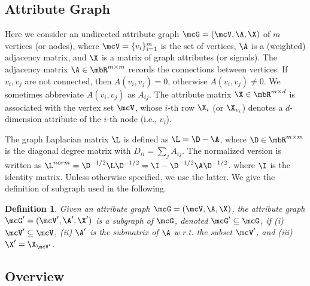\documentclass[letterpaper]{article} \usepackage{aaai19}  \usepackage{times}  \usepackage{helvet}  \usepackage{courier}  \usepackage{url}  \usepackage{graphicx}  \frenchspacing  \setlength{\pdfpagewidth}{8.5in}  \setlength{\pdfpageheight}{11in}
\def\ie{{i.e.}} \def\etal{{et.al}}
\newtheorem{defn}{Definition}
\begin{document}
\subsection{Attribute Graph}

Here we consider an undirected attribute graph $\mcG=(\mcV,\A,\X)$ of $m$ vertices (or nodes), where $\mcV=\{v_i\}_{i=1}^{m}$ is the set of vertices, $\A$ is a (weighted) adjacency matrix, and $\X$ is a matrix of graph attributes (or signals). The adjacency matrix $\A\in\mbR^{m\times m}$ records the connections between vertices. If $v_i, v_j$ are not connected, then $A(v_i,v_j)=0$, otherwise $A(v_i,v_j)\neq 0$. We sometimes abbreviate $A(v_i,v_j)$ as $A_{ij}$. The attribute matrix $\X\in\mbR^{m\times d}$ is associated with the vertex set $\mcV$, whose $i$-th row $\X_{i}$ (or $\X_{v_i}$) denotes a $d$-dimension attribute of the $i$-th node (\ie, $v_i$).

The graph Laplacian matrix $\L$ is defined as $\L = \D-\A$, where $\D\in\mbR^{m\times m}$ is the diagonal degree matrix with $D_{ii}=\sum_{j}A_{ij}$. The normalized version is written as $\L^{norm} = \D^{-1/2}\L\D^{-1/2}= \I-\D^{-1/2}\A\D^{-1/2}$.
where $\I$ is the identity matrix. Unless otherwise specified, we use the latter. We give the definition of subgraph used in the following.
\begin{defn} \label{def:graph}
	Given an attribute graph $\mcG=(\mcV,\A,\X)$, the attribute graph $\mcG'=(\mcV',\A',\X')$ is a subgraph of $\mcG$, denoted $\mcG'\subseteq\mcG$, if (i) $\mcV'\subseteq\mcV$, (ii) $\A'$ is the submatrix of $\A$ w.r.t. the subset $\mcV'$, and (iii) $\X'=\X_{\mcV'}$.
\end{defn}

\subsection{Overview}
\end{document}
